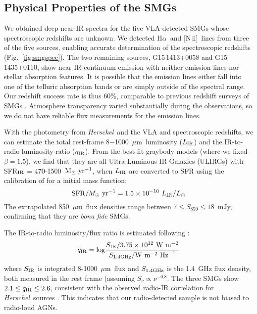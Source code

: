 \documentclass[iop,revtex4,twocolumn,apj,numberedappendix,appendixfloats]{emulateapj}
\newcommand{\hers}{{\it Herschel}}
\newcommand{\msunyr}{${\rm M}_{\odot}~{\rm yr}^{-1}$}
\newcommand{\um}{$\mu$m}
\newcommand{\Ha}{H$\alpha$}
\newcommand{\NII}{[N\,{\sc ii}]}
\begin{document}
\subsection{Physical Properties of the SMGs}

We obtained deep near-IR spectra for the five VLA-detected SMGs whose spectroscopic redshifts are unknown. We detected \Ha\ and \NII\ lines from three of the five sources, enabling accurate determination of the spectroscopic redshifts (Fig.~\ref{fig:smgspec}). The two remaining sources, G15\,1413+0058 and G15\,1435+0110, show near-IR continuum emission with neither emission lines nor stellar absorption features. It is possible that the emission lines either fall into one of the telluric absorption bands or are simply outside of the spectral range. Our redshift success rate is thus 60\%, comparable to previous redshift surveys of SMGs \citep[e.g.,][]{Chapman05}. Atmosphere transparency varied substantially during the observations, so we do not have reliable flux measurements for the emission lines.

With the photometry from \hers\ and the VLA and spectroscopic redshifts, we can estimate the total rest-frame 8$-$1000~\um\ luminosity ($L_{\rm IR}$) and the IR-to-radio luminosity ratio ($q_{\rm IR}$). From the best-fit graybody models (where we fixed $\beta = 1.5$), we find that they are all Ultra-Luminous IR Galaxies (ULIRGs) with SFR$_{\rm IR}$ = 470-1500~\msunyr, when $L_{\rm IR}$ are converted to SFR using the calibration of \citet{Murphy11} for a \citet{Kroupa02} initial mass function:
\begin{equation}
 {\rm SFR}/M_{\odot}~{\rm yr}^{-1} = 1.5\times10^{-10}~L_{\rm IR}/L_{\odot}
\end{equation} 
The extrapolated 850~\um\ flux densities range between $7 \leq S_{850} \leq 18$~mJy, confirming that they are {\it bona fide} SMGs. 

The IR-to-radio luminosity/flux ratio is estimated following \citet{Ivison10c}:
\begin{equation}
q_{\rm IR} = {\rm log} \frac{S_{\rm IR}/3.75\times10^{12}~{\rm W}~{\rm m}^{-2}}{S_{\rm 1.4 GHz}/{\rm W}~{\rm m}^{-2}~{\rm Hz}^{-1}}
\end{equation}
where $S_{\rm IR}$ is integrated 8-1000~\um\ flux and $S_{\rm 1.4GHz}$ is the 1.4~GHz flux density, both measured in the rest frame (assuming $S_\nu \propto \nu^{-0.8}$. The three SMGs show $2.1 \leq q_{\rm IR} \leq 2.6$, consistent with the observed radio-IR correlation for \hers\ sources \citep[$q_{\rm IR} = 2.4\pm0.5$;][]{Ivison10c}. This indicates that our radio-detected sample is not biased to radio-loud AGNs.
\end{document}
